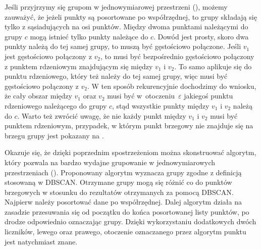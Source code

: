 

Jeśli przyjrzymy się grupom w jednowymiarowej przestrzeni (), możemy zauważyć, że jeżeli punkty są posortowane po współrzędnej, to grupy składają się tylko z sąsiadujących na osi punktów. Między dwoma punktami należącymi do grupy $ c $ mogą istnieć tylko punkty należące do $ c $. Dowód jest prosty, skoro dwa punkty należą do tej samej grupy, to muszą być gęstościowo połączone. Jeśli $ v_1 $ jest gęstościowo połączony z $ v_2 $, to musi być bezpośrednio gęstościowo połączony z punktem rdzeniowym znajdującym się między $ v_1 $ i $ v_2 $. To samo aplikuje się do punktu rdzeniowego, który też należy do tej samej grupy, więc musi być gęstościowo połączony z $ v_2 $. W ten sposób rekurencyjnie dochodzimy do wniosku, że cały obszar między $ v_1 $ oraz $ v_2 $ musi być \mbox{w otoczeniu $ \varepsilon $} jakiegoś punktu rdzeniowego należącego do grupy $ c $, stąd wszystkie punkty między $ v_1 $ i $ v_2 $ należą do $ c $. Warto też zwrócić uwagę, że nie każdy punkt między $ v_1 $ i $ v_2 $ musi być punktem rdzeniowym, przypadek, w którym punkt brzegowy nie znajduje się na brzegu grupy jest pokazany na .\par
Okazuje się, że dzięki poprzednim spostrzeżeniom można skonstruować algorytm, który pozwala na bardzo wydajne grupowanie w jednowymiarowych przestrzeniach (). Proponowany algorytm wyznacza grupy zgodne z definicją stosowaną w DBSCAN. Otrzymane grupy mogą się różnić co do punktów brzegowych w stosunku do rezultatów otrzymanych za pomocą DBSCAN. Najpierw należy posortować dane po współrzędnej. Dalej algorytm działa na zasadzie przesuwania się od początku do końca posortowanej listy punktów, po drodze odpowiednio oznaczając grupy. Dzięki wykorzystaniu dodatkowych dwóch liczników, lewego oraz prawego, otoczenie oznaczanego przez algorytm punktu jest natychmiast znane.\par



